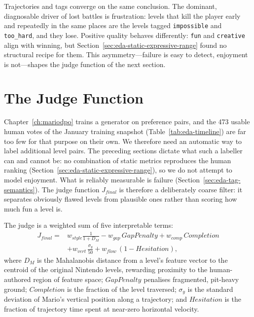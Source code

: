 \documentclass[shortabstract, mgr, english]{iithesis}
\begin{document}
Trajectories and tags converge on the same conclusion. The dominant,
diagnosable driver of lost battles is frustration: levels that kill the
player early and repeatedly in the same places are the levels tagged
\texttt{impossible} and \texttt{too\_hard}, and they lose. Positive quality
behaves differently: \texttt{fun} and \texttt{creative} align with winning,
but Section~\ref{sec:eda-static-expressive-range} found no structural recipe
for them. This asymmetry---failure is easy to detect, enjoyment is
not---shapes the judge function of the next section.

\section{The Judge Function}
\label{sec:dpo-judge}

Chapter~\ref{ch:mariodpo} trains a generator on preference pairs, and
the 473 usable human votes of the January training snapshot
(Table~\ref{tab:eda-timeline}) are far too few for that purpose on their own.
We therefore need an automatic way to label additional level pairs. The
preceding sections dictate what such a labeller can and cannot be: no
combination of static metrics reproduces the human ranking
(Section~\ref{sec:eda-static-expressive-range}), so we do not attempt to model
enjoyment. What is reliably measurable is failure
(Section~\ref{sec:eda-tag-semantics}). The judge function $J_{final}$ is
therefore a deliberately coarse filter: it separates obviously flawed levels
from plausible ones rather than scoring how much fun a level is.

The judge is a weighted sum of five interpretable terms:
%
\begin{equation}
\label{eq:dpo-j-final}
\begin{aligned}
J_{final} ={} & w_{style}\frac{1}{1 + D_M}
- w_{gap}\,\mathit{GapPenalty}
+ w_{comp}\,\mathit{Completion} \\
& + w_{vert}\,\frac{\sigma_y}{50}
+ w_{flow}\,(1 - \mathit{Hesitation}),
\end{aligned}
\end{equation}
%
where $D_M$ is the Mahalanobis distance from a level's feature vector
to the centroid of the original Nintendo levels, rewarding proximity to the
human-authored region of feature space; $\mathit{GapPenalty}$ penalises
fragmented, pit-heavy ground; $\mathit{Completion}$ is the fraction of the
level traversed; $\sigma_y$ is the standard deviation of Mario's vertical
position along a trajectory; and $\mathit{Hesitation}$ is the fraction of
trajectory time spent at near-zero horizontal velocity.
\end{document}
